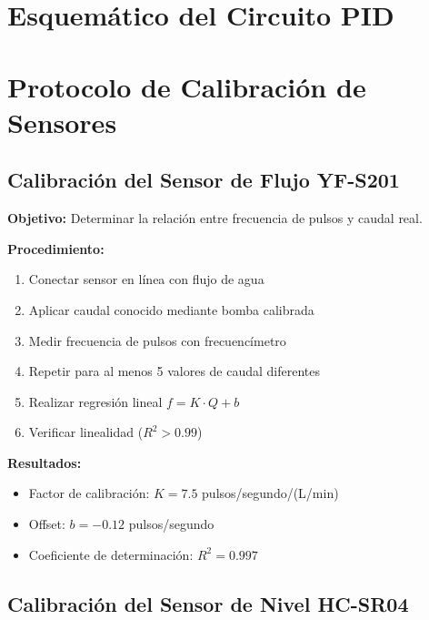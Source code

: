 \documentclass[conference]{IEEEtran}
\begin{document}
\section{Esquemático del Circuito PID}


\section{Protocolo de Calibración de Sensores}

\subsection{Calibración del Sensor de Flujo YF-S201}

\textbf{Objetivo:} Determinar la relación entre frecuencia de pulsos y caudal real.

\textbf{Procedimiento:}
\begin{enumerate}
\item Conectar sensor en línea con flujo de agua
\item Aplicar caudal conocido mediante bomba calibrada
\item Medir frecuencia de pulsos con frecuencímetro
\item Repetir para al menos 5 valores de caudal diferentes
\item Realizar regresión lineal $f = K \cdot Q + b$
\item Verificar linealidad ($R^2 > 0.99$)
\end{enumerate}

\textbf{Resultados:}
\begin{itemize}
\item Factor de calibración: $K = 7.5$ pulsos/segundo/(L/min)
\item Offset: $b = -0.12$ pulsos/segundo
\item Coeficiente de determinación: $R^2 = 0.997$
\end{itemize}

\subsection{Calibración del Sensor de Nivel HC-SR04}
\end{document}
